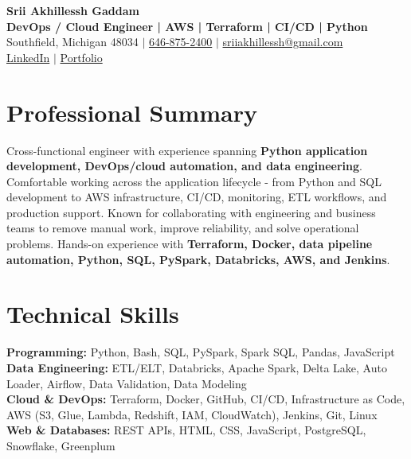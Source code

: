 \documentclass[letterpaper,10pt]{article}
\begin{document}
\fontsize{9.35pt}{10.45pt}\selectfont

\begin{center}
    {\LARGE \textbf{Srii Akhillessh Gaddam}} \\[-1pt]
    \textbf{DevOps / Cloud Engineer | AWS | Terraform | CI/CD | Python} \\[2pt]
    Southfield, Michigan 48034 $|$
    \href{tel:6468752400}{646-875-2400} $|$
    \href{mailto:sriiakhillessh@gmail.com}{sriiakhillessh@gmail.com} \\[1pt]
    \href{https://www.linkedin.com/in/srii-akhiilessh-gaddam-b48668191/}{LinkedIn} $|$
    \href{https://sriiakhillesshg.github.io/portfolio/}{Portfolio}
\end{center}
\vspace{-8pt}

\section{Professional Summary}
\small{Cross-functional engineer with experience spanning \textbf{Python application development, DevOps/cloud automation, and data engineering}. Comfortable working across the application lifecycle - from Python and SQL development to AWS infrastructure, CI/CD, monitoring, ETL workflows, and production support. Known for collaborating with engineering and business teams to remove manual work, improve reliability, and solve operational problems. Hands-on experience with \textbf{Terraform, Docker, data pipeline automation, Python, SQL, PySpark, Databricks, AWS, and Jenkins}.}

\section{Technical Skills}
\small{
\textbf{Programming:} Python, Bash, SQL, PySpark, Spark SQL, Pandas, JavaScript \\
\textbf{Data Engineering:} ETL/ELT, Databricks, Apache Spark, Delta Lake, Auto Loader, Airflow, Data Validation, Data Modeling \\
\textbf{Cloud \& DevOps:} Terraform, Docker, GitHub, CI/CD, Infrastructure as Code, AWS (S3, Glue, Lambda, Redshift, IAM, CloudWatch), Jenkins, Git, Linux \\
\textbf{Web \& Databases:} REST APIs, HTML, CSS, JavaScript, PostgreSQL, Snowflake, Greenplum
}
\end{document}
